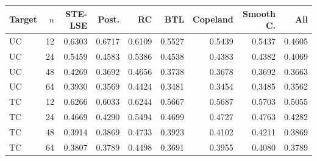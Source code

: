 \begin{tabular}{@{}lrrrrrrrr@{}}
\toprule
Target & $n$ & STE-LSE & Post. & RC & BTL & Copeland & Smooth C. & All\\
\midrule
UC & 12 & 0.6303 & 0.6717 & 0.6109 & 0.5527 & 0.5439 & 0.5437 & 0.4605\\
UC & 24 & 0.5459 & 0.4583 & 0.5386 & 0.4538 & 0.4383 & 0.4382 & 0.4069\\
UC & 48 & 0.4269 & 0.3692 & 0.4656 & 0.3738 & 0.3678 & 0.3692 & 0.3663\\
UC & 64 & 0.3930 & 0.3569 & 0.4424 & 0.3481 & 0.3454 & 0.3485 & 0.3562\\
TC & 12 & 0.6266 & 0.6033 & 0.6244 & 0.5667 & 0.5687 & 0.5703 & 0.5055\\
TC & 24 & 0.4669 & 0.4290 & 0.5494 & 0.4699 & 0.4727 & 0.4763 & 0.4282\\
TC & 48 & 0.3914 & 0.3869 & 0.4733 & 0.3923 & 0.4102 & 0.4211 & 0.3869\\
TC & 64 & 0.3807 & 0.3789 & 0.4498 & 0.3691 & 0.3955 & 0.4080 & 0.3789\\
\bottomrule
\end{tabular}
